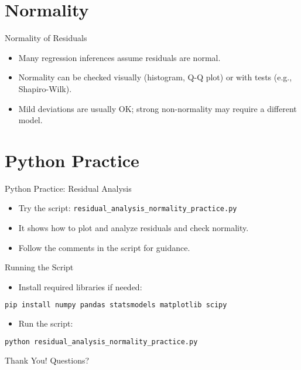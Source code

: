 \documentclass[aspectratio=169]{beamer}
\begin{document}
\section{Normality}
\begin{frame}{Normality of Residuals}
  \begin{itemize}
    \item Many regression inferences assume residuals are normal.
    \item Normality can be checked visually (histogram, Q-Q plot) or with tests (e.g., Shapiro-Wilk).
    \item Mild deviations are usually OK; strong non-normality may require a different model.
  \end{itemize}
\end{frame}

\section{Python Practice}
\begin{frame}{Python Practice: Residual Analysis}
  \begin{itemize}
    \item Try the script: \texttt{residual\_analysis\_normality\_practice.py}
    \item It shows how to plot and analyze residuals and check normality.
    \item Follow the comments in the script for guidance.
  \end{itemize}
\end{frame}

\begin{frame}[fragile]{Running the Script}
  \begin{itemize}
    \item Install required libraries if needed:
  \end{itemize}
  \begin{lstlisting}[language=bash]
pip install numpy pandas statsmodels matplotlib scipy
  \end{lstlisting}
  \begin{itemize}
    \item Run the script:
  \end{itemize}
  \begin{lstlisting}[language=bash]
python residual_analysis_normality_practice.py
  \end{lstlisting}
\end{frame}

\begin{frame}
  \centering
  \Huge Thank You!
  \vspace{1cm}
  \normalsize Questions?
\end{frame}
\end{document}
